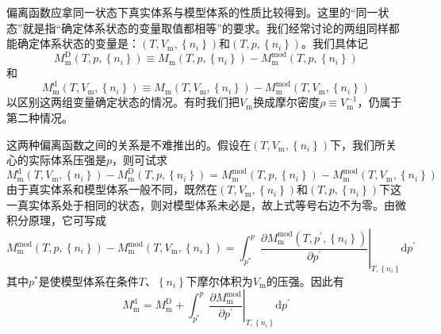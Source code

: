\documentclass[main.tex]{subfiles}
\begin{document}
偏离函数应拿同一状态下真实体系与模型体系的性质比较得到。这里的“同一状态”就是指“确定体系状态的变量取值都相等”的要求。我们经常讨论的两组同样都能确定体系状态的变量是：$\left(T,V_\text{m},\left\{n_i\right\}\right)$和$\left(T,p,\left\{n_i\right\}\right)$。我们具体记
\begin{equation}\label{eq:def_deviation_function_D}
    M^\text{D}_\text{m}\left(T,p,\left\{n_i\right\}\right)\equiv M_\text{m}\left(T,p,\left\{n_i\right\}\right)-M^\text{mod}_\text{m}\left(T,p,\left\{n_i\right\}\right)
\end{equation}
和
\begin{equation}\label{eq:def_deviation_function_d}
    M^\text{d}_\text{m}\left(T,V_\text{m},\left\{n_i\right\}\right)\equiv M_\text{m}\left(T,V_\text{m},\left\{n_i\right\}\right)-M^\text{mod}_\text{m}\left(T,V_\text{m},\left\{n_i\right\}\right)
\end{equation}
以区别这两组变量确定状态的情况。有时我们把$V_\text{m}$换成摩尔密度$\rho\equiv V^{-1}_\text{m}$，仍属于第二种情况。

这两种偏离函数之间的关系是不难推出的。假设在$\left(T,V_\text{m},\left\{n_i\right\}\right)$下，我们所关心的实际体系压强是$p$，则可试求
\[M^\text{d}_\text{m}\left(T,V_\text{m},\left\{n_i\right\}\right)-M^\text{D}_\text{m}\left(T,p,\left\{n_i\right\}\right)=M^\text{mod}_\text{m}\left(T,p,\left\{n_i\right\}\right)-M^\text{mod}_\text{m}\left(T,V_\text{m},\left\{n_i\right\}\right)\]
由于真实体系和模型体系一般不同，既然在$\left(T,V_\text{m},\left\{n_i\right\}\right)$和$\left(T,p,\left\{n_i\right\}\right)$下这一真实体系处于相同的状态，则对模型体系未必是，故上式等号右边不为零。由微积分原理，它可写成
\[M^\text{mod}_\text{m}\left(T,p,\left\{n_i\right\}\right)-M^\text{mod}_\text{m}\left(T,V_\text{m},\left\{n_i\right\}\right)=\int_{p^*}^p\left.\frac{\partial M^\text{mod}_\text{m}\left(T,p^\prime,\left\{n_i\right\}\right)}{\partial p^\prime}\right|_{T,\left\{n_i\right\}}\mathrm{d}p^\prime\]
其中$p^*$是使模型体系在条件$T$、$\left\{n_i\right\}$下摩尔体积为$V_\text{m}$的压强。因此有
\begin{equation}\label{eq:rel_MD_Md}
    M^\text{d}_\text{m}=M^\text{D}_\text{m}+\int_{p^*}^p\left.\frac{\partial M^\text{mod}_\text{m}}{\partial p^\prime}\right|_{T,\left\{n_i\right\}}\mathrm{d}p^\prime
\end{equation}
\end{document}
